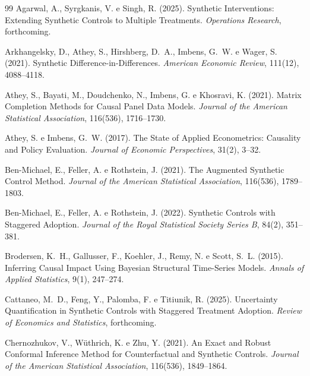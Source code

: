 \documentclass[12pt, a4paper, openany]{book}
\begin{document}
\begin{thebibliography}{99}
Agarwal, A., Syrgkanis, V. e Singh, R. (2025).
\newblock Synthetic Interventions: Extending Synthetic Controls to Multiple Treatments.
\newblock \textit{Operations Research}, forthcoming.

Arkhangelsky, D., Athey, S., Hirshberg, D.~A., Imbens, G.~W. e Wager, S. (2021).
\newblock Synthetic Difference-in-Differences.
\newblock \textit{American Economic Review}, 111(12), 4088--4118.

Athey, S., Bayati, M., Doudchenko, N., Imbens, G. e Khosravi, K. (2021).
\newblock Matrix Completion Methods for Causal Panel Data Models.
\newblock \textit{Journal of the American Statistical Association}, 116(536), 1716--1730.

Athey, S. e Imbens, G.~W. (2017).
\newblock The State of Applied Econometrics: Causality and Policy Evaluation.
\newblock \textit{Journal of Economic Perspectives}, 31(2), 3--32.

Ben-Michael, E., Feller, A. e Rothstein, J. (2021).
\newblock The Augmented Synthetic Control Method.
\newblock \textit{Journal of the American Statistical Association}, 116(536), 1789--1803.

Ben-Michael, E., Feller, A. e Rothstein, J. (2022).
\newblock Synthetic Controls with Staggered Adoption.
\newblock \textit{Journal of the Royal Statistical Society Series B}, 84(2), 351--381.

Brodersen, K.~H., Gallusser, F., Koehler, J., Remy, N. e Scott, S.~L. (2015).
\newblock Inferring Causal Impact Using Bayesian Structural Time-Series Models.
\newblock \textit{Annals of Applied Statistics}, 9(1), 247--274.

Cattaneo, M.~D., Feng, Y., Palomba, F. e Titiunik, R. (2025).
\newblock Uncertainty Quantification in Synthetic Controls with Staggered Treatment Adoption.
\newblock \textit{Review of Economics and Statistics}, forthcoming.

Chernozhukov, V., Wüthrich, K. e Zhu, Y. (2021).
\newblock An Exact and Robust Conformal Inference Method for Counterfactual and Synthetic Controls.
\newblock \textit{Journal of the American Statistical Association}, 116(536), 1849--1864.


\end{thebibliography}
\end{document}
